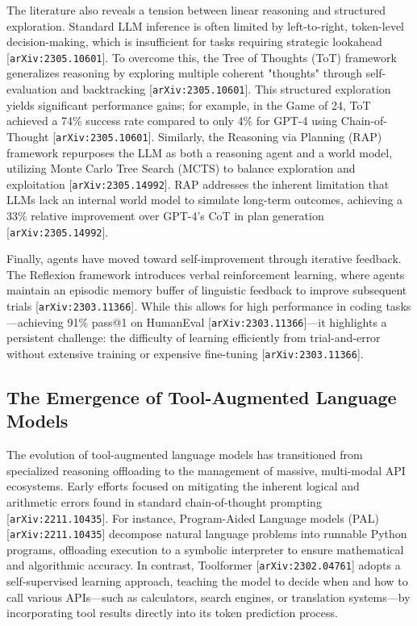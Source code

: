 \documentclass[11pt]{article}
\begin{document}
The literature also reveals a tension between linear reasoning and structured exploration. Standard LLM inference is often limited by left-to-right, token-level decision-making, which is insufficient for tasks requiring strategic lookahead [\texttt{arXiv:2305.10601}]. To overcome this, the Tree of Thoughts (ToT) framework generalizes reasoning by exploring multiple coherent "thoughts" through self-evaluation and backtracking [\texttt{arXiv:2305.10601}]. This structured exploration yields significant performance gains; for example, in the Game of 24, ToT achieved a 74\% success rate compared to only 4\% for GPT-4 using Chain-of-Thought [\texttt{arXiv:2305.10601}]. Similarly, the Reasoning via Planning (RAP) framework repurposes the LLM as both a reasoning agent and a world model, utilizing Monte Carlo Tree Search (MCTS) to balance exploration and exploitation [\texttt{arXiv:2305.14992}]. RAP addresses the inherent limitation that LLMs lack an internal world model to simulate long-term outcomes, achieving a 33\% relative improvement over GPT-4's CoT in plan generation [\texttt{arXiv:2305.14992}].

Finally, agents have moved toward self-improvement through iterative feedback. The Reflexion framework introduces verbal reinforcement learning, where agents maintain an episodic memory buffer of linguistic feedback to improve subsequent trials [\texttt{arXiv:2303.11366}]. While this allows for high performance in coding tasks—achieving 91\% pass@1 on HumanEval [\texttt{arXiv:2303.11366}]—it highlights a persistent challenge: the difficulty of learning efficiently from trial-and-error without extensive training or expensive fine-tuning [\texttt{arXiv:2303.11366}].

\subsection{The Emergence of Tool-Augmented Language Models}

The evolution of tool-augmented language models has transitioned from specialized reasoning offloading to the management of massive, multi-modal API ecosystems. Early efforts focused on mitigating the inherent logical and arithmetic errors found in standard chain-of-thought prompting [\texttt{arXiv:2211.10435}]. For instance, Program-Aided Language models (PAL) [\texttt{arXiv:2211.10435}] decompose natural language problems into runnable Python programs, offloading execution to a symbolic interpreter to ensure mathematical and algorithmic accuracy. In contrast, Toolformer [\texttt{arXiv:2302.04761}] adopts a self-supervised learning approach, teaching the model to decide when and how to call various APIs—such as calculators, search engines, or translation systems—by incorporating tool results directly into its token prediction process.
\end{document}
